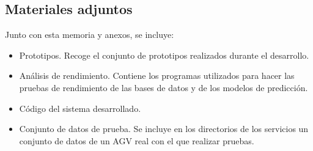 \subsection{Materiales adjuntos}

Junto con esta memoria y anexos, se incluye:
\begin{itemize}
    \item Prototipos. Recoge el conjunto de prototipos realizados durante el desarrollo.
    \item Análisis de rendimiento. Contiene los programas utilizados para hacer las pruebas de rendimiento 
        de las bases de datos y de los modelos de predicción.
    \item Código del sistema desarrollado.
    \item Conjunto de datos de prueba. Se incluye en los directorios de los servicios un conjunto de datos de un AGV 
        real con el que realizar pruebas.
\end{itemize}